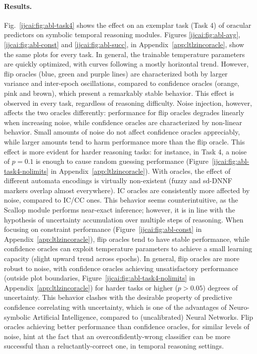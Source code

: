 \paragraph{Results.}
Fig.~\ref{ijcai:fig:abl-task4} shows the effect on an exemplar task (Task 4) of oracular predictors on symbolic temporal reasoning modules.
Figures \ref{ijcai:fig:abl-avg}, \ref{ijcai:fig:abl-const} and \ref{ijcai:fig:abl-succ}, in Appendix~\ref{app:ltlzincoracle}, show the same plots for every task.
%
In general, the trainable temperature parameters are quickly optimized, with curves following a mostly horizontal trend. However, flip oracles (blue, green and purple lines) are characterized both by larger variance and inter-epoch oscillations, compared to confidence oracles (orange, pink and brown), which present a remarkably stable behavior. This effect is observed in every task, regardless of reasoning difficulty.
%
Noise injection, however, affects the two oracles differently: performance for flip oracles degrades linearly when increasing noise, while confidence oracles are characterized by non-linear behavior. Small amounts of noise do not affect confidence oracles appreciably, while larger amounts tend to harm performance more than the flip oracle. This effect is more evident for harder reasoning tasks: for instance, in Task 4, a noise of $p = 0.1$ is enough to cause random guessing performance (Figure~\ref{ijcai:fig:abl-task4-nolimits} in Appendix~\ref{app:ltlzincoracle}).
%
With oracles, the effect of different automata encodings is virtually non-existent (fuzzy and sd-DNNF markers overlap almost everywhere). 
%
\textsc{IC} oracles are consistently more affected by noise, compared to \textsc{IC/CC} ones. This behavior seems counterintuitive, as the Scallop module performs near-exact inference; however, it is in line with the hypothesis of uncertainty accumulation over multiple steps of reasoning.
%
When focusing on constraint performance (Figure~\ref{ijcai:fig:abl-const} in Appendix~\ref{app:ltlzincoracle}), flip oracles tend to have stable performance, while confidence oracles can exploit temperature parameters to achieve a small learning capacity (slight upward trend across epochs).
In general, flip oracles are more robust to noise, with confidence oracles achieving unsatisfactory performance (outside plot boundaries, Figure~\ref{ijcai:fig:abl-task4-nolimits} in Appendix~\ref{app:ltlzincoracle}) for harder tasks or higher ($p > 0.05$) degrees of uncertainty.
This behavior clashes with the desirable property of predictive confidence correlating with uncertainty, which is one of the advantages of Neuro-symbolic Artificial Intelligence, compared to (uncalibrated) Neural Networks. Flip oracles achieving better performance than confidence oracles, for similar levels of noise, hint at the fact that an overconfidently-wrong classifier can be more successful than a reluctantly-correct one, in temporal reasoning settings.
